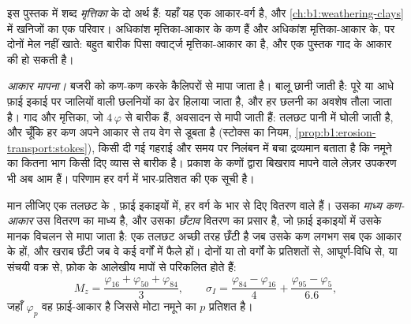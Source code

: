इस पुस्तक में शब्द \emph{मृत्तिका} के दो अर्थ हैं: यहाँ यह एक आकार-वर्ग है, और \cref{ch:b1:weathering-clays} में खनिजों का एक परिवार। अधिकांश मृत्तिका-आकार के कण  हैं और अधिकांश  मृत्तिका-आकार के, पर दोनों मेल नहीं खाते: बहुत बारीक पिसा क्वार्ट्ज मृत्तिका-आकार का है, और एक  पुस्तक गाद के आकार की हो सकती है।

\emph{आकार मापना।} बजरी को कण-कण करके कैलिपरों से मापा जाता है। बालू छानी जाती है: पूरे या आधे फ़ाई इकाई पर जालियों वाली छलनियों का ढेर हिलाया जाता है, और हर छलनी का अवशेष तौला जाता है। गाद और मृत्तिका, जो $4\,\varphi$ से बारीक हैं, अवसादन से मापी जाती हैं: तलछट पानी में घोली जाती है, और चूँकि हर कण अपने आकार से तय वेग से डूबता है (स्टोक्स का नियम, \cref{prop:b1:erosion-transport:stokes}), किसी दी गई गहराई और समय पर निलंबन में बचा द्रव्यमान बताता है कि नमूने का कितना भाग किसी दिए व्यास से बारीक है। प्रकाश के कणों द्वारा बिखराव मापने वाले लेज़र उपकरण भी अब आम हैं। परिणाम हर वर्ग में भार-प्रतिशत की एक सूची है।

\begin{definition}[माध्य कण-आकार, छँटाव]\label{def:b1:clastic-sediments:sorting}
मान लीजिए एक तलछट के , फ़ाई इकाइयों में, हर वर्ग के भार से दिए वितरण वाले हैं। उसका \emph{माध्य कण-आकार} उस वितरण का माध्य है, और उसका \emph{छँटाव} वितरण का प्रसार है, जो फ़ाई इकाइयों में उसके मानक विचलन से मापा जाता है: एक तलछट अच्छी तरह छँटी है जब उसके कण लगभग सब एक आकार के हों, और खराब छँटी जब वे कई वर्गों में फैले हों। दोनों या तो वर्गों के प्रतिशतों से, आघूर्ण-विधि से, या संचयी वक्र से, फ़ोक के आलेखीय मापों से परिकलित होते हैं:
\[
  M_z = \frac{\varphi_{16} + \varphi_{50} + \varphi_{84}}{3}, \qquad
  \sigma_I = \frac{\varphi_{84} - \varphi_{16}}{4} + \frac{\varphi_{95} - \varphi_{5}}{6.6},
\]
जहाँ $\varphi_p$ वह फ़ाई-आकार है जिससे मोटा नमूने का $p$ प्रतिशत है।
\end{definition}

